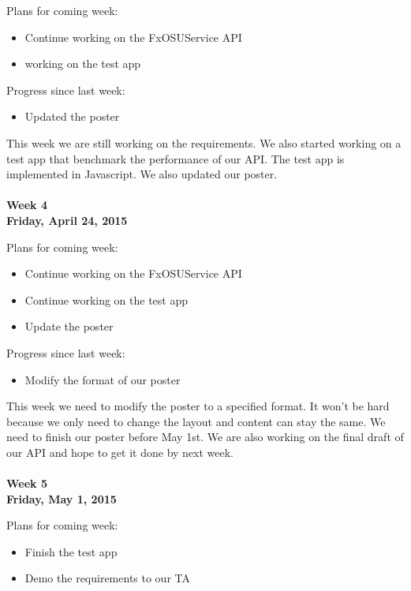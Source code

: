\noindent Plans for coming week:
\begin{itemize}
\item Continue working on the FxOSUService API
\item working on the test app
\end{itemize}

\noindent Progress since last week:
\begin{itemize}
\item Updated the poster
\end{itemize}

\noindent This week we are still working on the requirements. We also started working on a test app that benchmark the performance of our API. The test app is implemented in Javascript. We also updated our poster. \\
\\
\textbf{Week 4\\Friday, April 24, 2015\\}

\noindent Plans for coming week:
\begin{itemize}
\item Continue working on the FxOSUService API
\item Continue working on the test app
\item Update the poster
\end{itemize}

\noindent Progress since last week:
\begin{itemize}
\item Modify the format of our poster
\end{itemize}

\noindent This week we need to modify the poster to a specified format. It won't be hard because we only need to change the layout and content can stay the same. We need to finish our poster before May 1st. We are also working on the final draft of our API and hope to get it done by next week. \\
\\
\textbf{Week 5\\Friday, May 1, 2015\\}

\noindent Plans for coming week:
\begin{itemize}
\item Finish the test app
\item Demo the requirements to our TA
\end{itemize}


